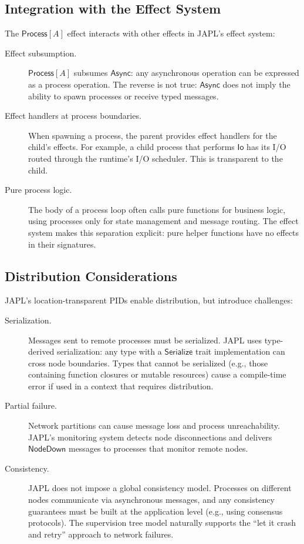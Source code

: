 \documentclass[11pt,a4paper]{article}
\begin{document}
\subsection{Integration with the Effect System}

The $\mathsf{Process}[A]$ effect interacts with other effects in JAPL's effect system:

\begin{description}
\item[Effect subsumption.] $\mathsf{Process}[A]$ subsumes $\mathsf{Async}$: any asynchronous operation can be expressed as a process operation. The reverse is not true: $\mathsf{Async}$ does not imply the ability to spawn processes or receive typed messages.

\item[Effect handlers at process boundaries.] When spawning a process, the parent provides effect handlers for the child's effects. For example, a child process that performs $\mathsf{Io}$ has its I/O routed through the runtime's I/O scheduler. This is transparent to the child.

\item[Pure process logic.] The body of a process loop often calls pure functions for business logic, using processes only for state management and message routing. The effect system makes this separation explicit: pure helper functions have no effects in their signatures.
\end{description}

\subsection{Distribution Considerations}

JAPL's location-transparent PIDs enable distribution, but introduce challenges:

\begin{description}
\item[Serialization.] Messages sent to remote processes must be serialized. JAPL uses type-derived serialization: any type with a $\mathsf{Serialize}$ trait implementation can cross node boundaries. Types that cannot be serialized (e.g., those containing function closures or mutable resources) cause a compile-time error if used in a context that requires distribution.

\item[Partial failure.] Network partitions can cause message loss and process unreachability. JAPL's monitoring system detects node disconnections and delivers $\mathsf{NodeDown}$ messages to processes that monitor remote nodes.

\item[Consistency.] JAPL does not impose a global consistency model. Processes on different nodes communicate via asynchronous messages, and any consistency guarantees must be built at the application level (e.g., using consensus protocols). The supervision tree model naturally supports the ``let it crash and retry'' approach to network failures.
\end{description}
\end{document}

